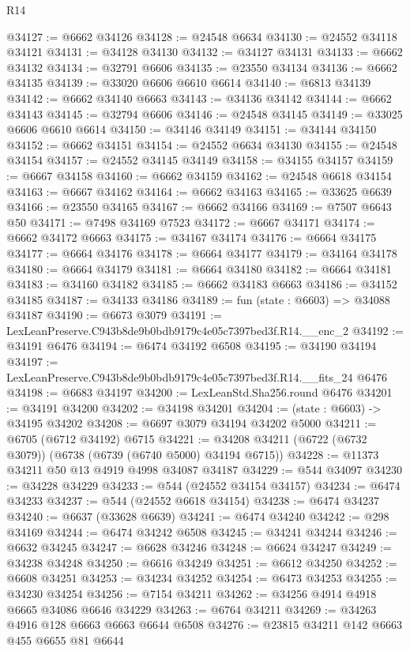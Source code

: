 \begin{lexlean}{R14}
\begin{coremodule}
@34127 := @6662 @34126
@34128 := @24548 @6634
@34130 := @24552 @34118 @34121
@34131 := @34128 @34130
@34132 := @34127 @34131
@34133 := @6662 @34132
@34134 := @32791 @6606
@34135 := @23550 @34134
@34136 := @6662 @34135
@34139 := @33020 @6606 @6610 @6614
@34140 := @6813 @34139
@34142 := @6662 @34140 @6663
@34143 := @34136 @34142
@34144 := @6662 @34143
@34145 := @32794 @6606
@34146 := @24548 @34145
@34149 := @33025 @6606 @6610 @6614
@34150 := @34146 @34149
@34151 := @34144 @34150
@34152 := @6662 @34151
@34154 := @24552 @6634 @34130
@34155 := @24548 @34154
@34157 := @24552 @34145 @34149
@34158 := @34155 @34157
@34159 := @6667 @34158
@34160 := @6662 @34159
@34162 := @24548 @6618 @34154
@34163 := @6667 @34162
@34164 := @6662 @34163
@34165 := @33625 @6639
@34166 := @23550 @34165
@34167 := @6662 @34166
@34169 := @7507 @6643 @50
@34171 := @7498 @34169 @7523
@34172 := @6667 @34171
@34174 := @6662 @34172 @6663
@34175 := @34167 @34174
@34176 := @6664 @34175
@34177 := @6664 @34176
@34178 := @6664 @34177
@34179 := @34164 @34178
@34180 := @6664 @34179
@34181 := @6664 @34180
@34182 := @6664 @34181
@34183 := @34160 @34182
@34185 := @6662 @34183 @6663
@34186 := @34152 @34185
@34187 := @34133 @34186
@34189 := fun (state : @6603) => @34088 @34187
@34190 := @6673 @3079
@34191 := LexLeanPreserve.C943b8de9b0bdb9179c4e05c7397bed3f.R14.__enc_2
@34192 := @34191 @6476
@34194 := @6474 @34192 @6508
@34195 := @34190 @34194
@34197 := LexLeanPreserve.C943b8de9b0bdb9179c4e05c7397bed3f.R14.__fits_24 @6476
@34198 := @6683 @34197
@34200 := LexLeanStd.Sha256.round @6476
@34201 := @34191 @34200
@34202 := @34198 @34201
@34204 := (state : @6603) -> @34195 @34202
@34208 := @6697 @3079 @34194 @34202 @5000
@34211 := @6705 (@6712 @34192) @6715
@34221 := @34208 @34211 (@6722 (@6732 @3079)) (@6738 (@6739 (@6740 @5000) @34194 @6715))
@34228 := @11373 @34211 @50 @13 @4919 @4998 @34087 @34187
@34229 := @544 @34097
@34230 := @34228 @34229
@34233 := @544 (@24552 @34154 @34157)
@34234 := @6474 @34233
@34237 := @544 (@24552 @6618 @34154)
@34238 := @6474 @34237
@34240 := @6637 (@33628 @6639)
@34241 := @6474 @34240
@34242 := @298 @34169
@34244 := @6474 @34242 @6508
@34245 := @34241 @34244
@34246 := @6632 @34245
@34247 := @6628 @34246
@34248 := @6624 @34247
@34249 := @34238 @34248
@34250 := @6616 @34249
@34251 := @6612 @34250
@34252 := @6608 @34251
@34253 := @34234 @34252
@34254 := @6473 @34253
@34255 := @34230 @34254
@34256 := @7154 @34211
@34262 := @34256 @4914 @4918 @6665 @34086 @6646 @34229
@34263 := @6764 @34211
@34269 := @34263 @4916 @128 @6663 @6663 @6644 @6508
@34276 := @23815 @34211 @142 @6663 @455 @6655 @81 @6644

\end{coremodule}
\end{lexlean}
